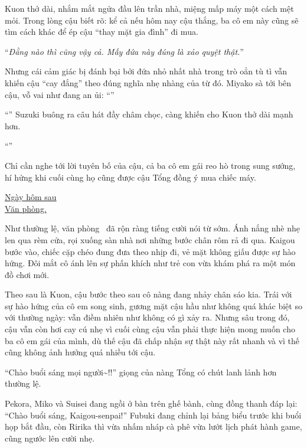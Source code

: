 \documentclass[../main.tex]{subfiles}
\begin{document}
Kuon thở dài, nhắm mắt ngửa đầu lên trần nhà, miệng mấp máy một cách mệt mỏi. Trong lòng cậu biết rõ: kể cả nếu hôm nay cậu thắng, ba cô em này cũng sẽ tìm cách khác để ép cậu ``thay mặt gia đình'' đi mua.

``\textit{Đằng nào thì cũng vậy cả. Mấy đứa này đúng là xảo quyệt thật.}''

Nhưng cái cảm giác bị đánh bại bởi đứa nhỏ nhất nhà trong trò oẳn tù tì vẫn khiến cậu ``cay đắng'' theo đúng nghĩa nhẹ nhàng của từ đó. Miyako sà tới bên cậu, vỗ vai như đang an ủi: ``''

``'' Suzuki buông ra câu hát đầy châm chọc, càng khiến cho Kuon thở dài mạnh hơn.

``''

Chỉ cần nghe tới lời tuyên bố của cậu, cả ba cô em gái reo hò trong sung sướng, hí hửng khi cuối cùng họ cũng được cậu Tổng đồng ý mua chiếc máy.

\begin{center}
    \uline{Ngày hôm sau\\Văn phòng.}
\end{center}

Như thường lệ, văn phòng \hll\ đã rộn ràng tiếng cười nói từ sớm. Ánh nắng nhè nhẹ len qua rèm cửa, rọi xuống sàn nhà nơi những bước chân rôm rả đi qua. Kaigou bước vào, chiếc cặp chéo đung đưa theo nhịp đi, vẻ mặt không giấu được sự hào hứng. Đôi mắt cô ánh lên sự phấn khích như trẻ con vừa khám phá ra một món đồ chơi mới.

Theo sau là Kuon, cậu bước theo sau cô nàng đang nhảy chân sáo kia. Trái với sự hào hứng của cô em song sinh, gương mặt cậu hầu như không quá khác biệt so với thường ngày: vẫn điềm nhiên như không có gì xảy ra. Nhưng sâu trong đó, cậu vẫn còn hơi cay cú nhẹ vì cuối cùng cậu vẫn phải thực hiện mong muốn cho ba cô em gái của mình, dù thế cậu đã chấp nhận sự thật này rất nhanh và vì thế cũng không ảnh hưởng quá nhiều tới cậu.

``Chào buổi sáng mọi người\~{}!!'' giọng của nàng Tổng có chút lanh lảnh hơn thường lệ.

Pekora, Miko và Suisei đang ngồi ở bàn trên ghế bành, cùng đồng thanh đáp lại: ``Chào buổi sáng, Kaigou-senpai!'' Fubuki đang chỉnh lại bảng biểu trước khi buổi họp bắt đầu, còn Ririka thì vừa nhấm nháp cà phê vừa lướt lịch phát hành game, cũng ngước lên cười nhẹ.
\end{document}
